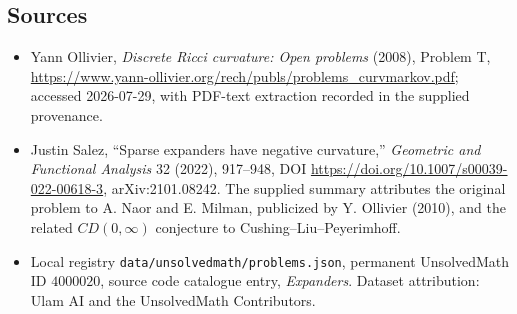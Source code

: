 \documentclass[11pt]{article}
\begin{document}
\subsection{Sources}
\begin{itemize}
\item Yann Ollivier, \emph{Discrete Ricci curvature: Open problems} (2008), Problem T, \url{https://www.yann-ollivier.org/rech/publs/problems_curvmarkov.pdf}; accessed 2026-07-29, with PDF-text extraction recorded in the supplied provenance.
\item Justin Salez, ``Sparse expanders have negative curvature,'' \emph{Geometric and Functional Analysis} 32 (2022), 917--948, DOI \url{https://doi.org/10.1007/s00039-022-00618-3}, arXiv:2101.08242. The supplied summary attributes the original problem to A. Naor and E. Milman, publicized by Y. Ollivier (2010), and the related $CD(0,\infty)$ conjecture to Cushing--Liu--Peyerimhoff.
\item Local registry \texttt{data/unsolvedmath/problems.json}, permanent UnsolvedMath ID $4000020$, source code catalogue entry, \emph{Expanders}. Dataset attribution: Ulam AI and the UnsolvedMath Contributors.
\end{itemize}
\end{document}
